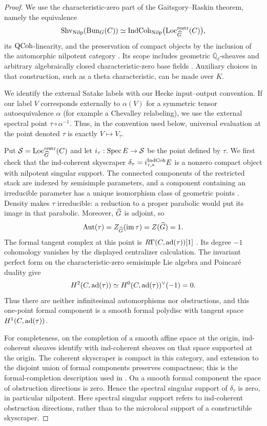 \begin{proof}
We use the characteristic-zero part of the Gaitsgory--Raskin theorem,
namely the equivalence
\[
 \operatorname{Shv}_{\mathrm{Nilp}}(\operatorname{Bun}_G(C))
 \simeq
 \operatorname{IndCoh}_{\mathrm{Nilp}}
       \bigl(\operatorname{Loc}^{\mathrm{restr}}_{\widehat G}(C)\bigr),
\]
its $\operatorname{QCoh}$-linearity, and the preservation of compact objects by the
inclusion of the automorphic nilpotent category
\cite[Main Theorem~1.3.9(ii), Lemma~1.3.7, and Theorem~1.1.7]{GR}.
Its scope includes geometric $\overline{\mathbb Q}_\ell$-sheaves and
arbitrary algebraically closed characteristic-zero base fields
\cite[Section~2.3]{GR}.  Auxiliary choices in that construction, such as
a theta characteristic, can be made over $K$.

We identify the external Satake labels with our Hecke input--output
convention.  If our label $V$ corresponds externally to $\alpha(V)$
for a symmetric tensor autoequivalence $\alpha$ (for example a Chevalley
relabeling), we use the external spectral point
$\tau\circ\alpha^{-1}$.  Thus, in the convention used below, universal
evaluation at the point denoted $\tau$ is exactly $V\mapsto V_\tau$.

Put $\mathcal S=\operatorname{Loc}^{\mathrm{restr}}_{\widehat G}(C)$ and let
$i_\tau:\operatorname{Spec} E\to\mathcal S$ be the point defined by $\tau$.
We first check that the ind-coherent skyscraper
$\delta_\tau=i_{\tau,*}^{\operatorname{IndCoh}}E$ is a nonzero compact object with
nilpotent singular support.  The connected components of the restricted
stack are indexed by semisimple parameters, and a component containing
an irreducible parameter has a unique isomorphism class of geometric
points \cite[Proposition~3.7.2 and Corollary~3.7.5]{AGKRRV}.
Density makes $\tau$ irreducible: a reduction to a proper parabolic
would put its image in that parabolic.  Moreover, $\widehat G$ is adjoint, so
\[
 \operatorname{Aut}(\tau)=Z_{\widehat G}(\operatorname{im}\tau)
 =Z(\widehat G)=1.
\]
The formal tangent complex at this point is
$R\Gamma(C,\operatorname{ad}(\tau))[1]$
\cite[Section~21.2.1]{AGKRRV}.  Its degree $-1$ cohomology vanishes by
the displayed centralizer calculation.  The invariant perfect form on
the characteristic-zero semisimple Lie algebra and Poincar\'e duality
give
\[
 H^2(C,\operatorname{ad}(\tau))
 \simeq H^0(C,\operatorname{ad}(\tau))^\vee(-1)=0.
\]
Thus there are neither infinitesimal automorphisms nor obstructions,
and this one-point formal component is a smooth formal polydisc with
tangent space $H^1(C,\operatorname{ad}(\tau))$.

For completeness, on the completion of a smooth affine space at the
origin, ind-coherent sheaves identify with ind-coherent sheaves on that
space supported at the origin.  The coherent skyscraper is compact in
this category, and extension to the disjoint union of formal components
preserves compactness; this is the formal-completion description used in
\cite[Sections~21.1.7--21.1.10]{AGKRRV}.  On a smooth formal component
the space of obstruction directions is zero.  Hence the spectral
singular support of $\delta_\tau$ is zero, in particular nilpotent.
Here spectral singular support refers to ind-coherent obstruction
directions, rather than to the microlocal support of a constructible
skyscraper.


\end{proof}
